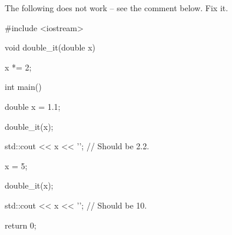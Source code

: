 The following does not work -- see the comment below. Fix it.



\begin{consolethree}[escapeinside=||]

#include <iostream>



void double_it(double x)

{

    x *= 2;

}



int main()

{

    double x = 1.1;

    double_it(x);

    std::cout << x << '\n'; // Should be 2.2.

    x = 5;

    double_it(x);

    std::cout << x << '\n'; // Should be 10.

    return 0;

}

\end{consolethree}


